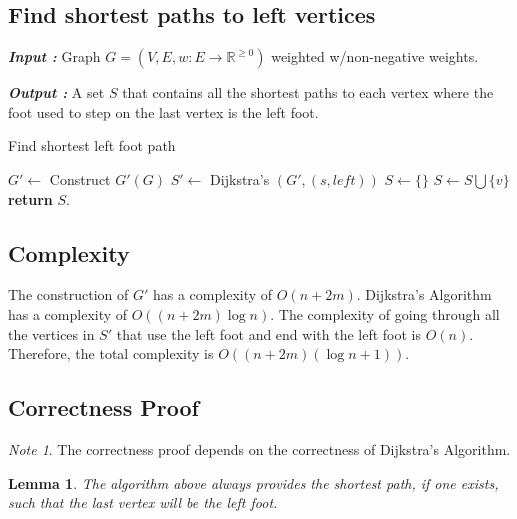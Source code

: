 \documentclass{article}
\theoremstyle{definition}
\theoremstyle{remark}
\newtheorem{note}{Note}[section]
\theoremstyle{plain}
\newtheorem{lem}[thm]{Lemma}
\begin{document}
\subsection{Find shortest paths to left vertices}

\textbf{\textit{Input :}}
Graph $G=(V,E, w:E \rightarrow \mathbb{R}^{\ge 0})$ weighted w/non-negative weights.

\textbf{\textit{Output :}}
A set $S$ that contains all the shortest paths to each vertex where the foot used to step on the last vertex is the left foot.

\begin{algorithm}
\caption{Find shortest left foot path}\label{Find the shortest left foot path}
\begin{algorithmic}[1]
	\State $G' \gets $ Construct $G'(G)$ 
	\State $S' \gets $ Dijkstra's $(G', (s, left))$ 
	\State $S \gets \{\}$
		\State $S \gets S \bigcup \{v\}$
	\EndFor  {}
	\State \textbf{return} $S$. 
\EndProcedure {}
\end{algorithmic}
\end{algorithm}

\subsection{Complexity}

The construction of $G'$ has a complexity of $O(n+2m)$. Dijkstra's Algorithm has a complexity of $O((n + 2m)\log n)$. The complexity of going through all the vertices in $S'$ that use the left foot and end with the left  foot is $O(n)$. Therefore, the total complexity is $O((n + 2m)(\log n + 1))$. 

\subsection{Correctness Proof}
\begin{note}
The correctness proof depends on the correctness of Dijkstra's Algorithm.
\end{note}
\begin{lem}
The algorithm above always provides the shortest path, if one exists, such that the last vertex will be the left foot.
\end{lem}
\end{document}
